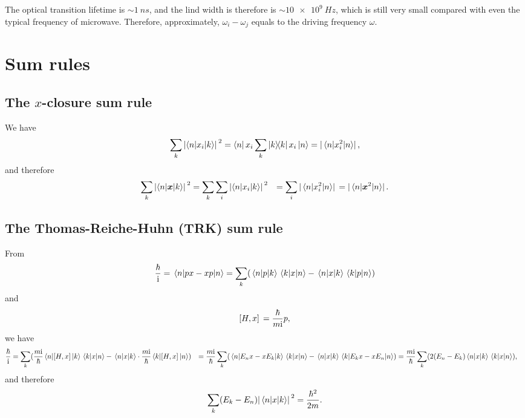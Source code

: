 \documentclass[hyperref, a4paper]{article}
\newcommand*{\ii}{\mathrm{i}}
\def\\{}%
\begin{document}
The optical transition lifetime is $\sim \SI{1}{ns}$,
and the lind width is therefore 
is $\sim \SI{10e9}{Hz}$,
which is still very small compared with 
even the typical frequency of microwave.
Therefore, approximately, $\omega_i - \omega_j$ equals to the driving frequency $\omega$.

\section{Sum rules}

\subsection{The $x$-closure sum rule}

We have
\begin{equation}
    \sum_{k} \abs*{\mel**{n}{x_i}{k}}^2 = \bra{n} x_i \sum_k \dyad{k} x_i \ket*{n} = \abs*{\expval*{x_i^2}{n}},
\end{equation}
and therefore 
\begin{equation}
    \begin{aligned}
        \sum_{k} \abs*{\mel**{n}{\vb*{x}}{k}}^2 &=
        \sum_k \sum_i  \abs*{\mel**{n}{x_i}{k}}^2 \\
        &= \sum_i \abs*{\expval*{x_i^2}{n}} = \abs*{\expval*{\vb*{x}^2}{n}}.
    \end{aligned}
\end{equation}

\subsection{The Thomas-Reiche-Huhn (TRK) sum rule}

From 
\begin{equation}
    \frac{\hbar}{\ii} = \expval*{px - xp}{n} 
    = \sum_k (
        \mel{n}{p}{k} \mel{k}{x}{n}
        - \mel{n}{x}{k} \mel{k}{p}{n}
    )
\end{equation}
and 
\begin{equation}
    \comm*{H}{x} = \frac{\hbar}{m \ii}p,
\end{equation}
we have 
\[
    \begin{aligned}
        \frac{\hbar}{\ii} &= \sum_k (
            \frac{m \ii}{\hbar} \mel{n}{\comm*{H}{x}}{k} \mel{k}{x}{n}
            - \mel{n}{x}{k} \cdot \frac{m \ii}{\hbar} \mel{k}{\comm*{H}{x}}{n}
        ) \\
        &= \frac{m \ii}{\hbar} \sum_k (
            \mel{n}{E_n x - x E_k}{k} \mel{k}{x}{n}
            - \mel{n}{x}{k} \mel{k}{E_k x - x E_n}{n}
        ) \\
        &= \frac{m \ii}{\hbar} \sum_k (
            2 (E_n - E_k)  \mel{n}{x}{k} \mel{k}{x}{n}
        ) ,
    \end{aligned}
\]
and therefore
\begin{equation}
    \sum_k (E_k - E_n) \abs*{\mel{n}{x}{k}}^2 = \frac{\hbar^2}{2m}.
\end{equation}
\end{document}
